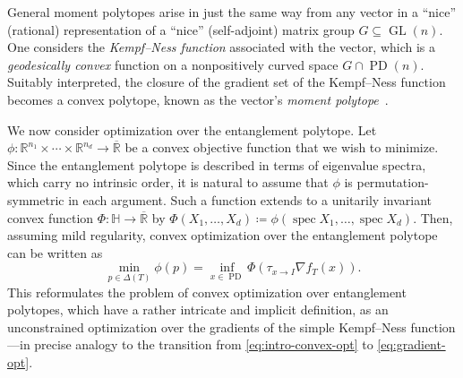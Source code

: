 \documentclass[11pt,letterpaper]{article}
\numberwithin{equation}{section}
\newcommand{\RR}{\mathbb{R}}
\newcommand{\bbH}{\mathbb{H}}
\DeclareMathOperator{\PD}{PD}
\DeclareMathOperator{\spec}{spec}
\DeclareMathOperator{\GL}{GL}
\begin{document}
General moment polytopes arise in just the same way from any vector in a ``nice'' (rational) representation of a ``nice'' (self-adjoint) matrix group $G \subseteq \GL(n)$.
One considers the \emph{Kempf--Ness function} associated with the vector, which is a \emph{geodesically convex} function on a nonpositively curved space $G \cap \PD(n)$.
Suitably interpreted, the closure of the gradient set of the Kempf--Ness function becomes a convex polytope, known as the vector's \emph{moment polytope}~\cite{Kirwan1984,NessMumford1984,BFGOWW2019}.

\medskip

We now consider optimization over the entanglement polytope.
Let $\phi \colon \RR^{n_1}\times\cdots\times\RR^{n_d}\to\overline{\RR}$ be a convex objective function that we wish to minimize.
Since the entanglement polytope is described in terms of eigenvalue spectra, which carry no intrinsic order, it is natural to assume that $\phi$ is permutation-symmetric in each argument.
Such a function extends to a unitarily invariant convex function $\Phi \colon \bbH\to \overline{\RR}$ by $\Phi(X_1,\dots,X_d)\coloneqq \phi(\spec X_1,\dots,\spec X_d)$.
Then, assuming mild regularity, convex optimization over the entanglement polytope can be written as
\begin{equation}\label{eq:intro phi to Phi}
    \min_{p\in\Delta(T)} \phi(p) = \inf_{x\in\PD}\Phi(\tau_{x\to I} \nabla f_T(x)).
\end{equation}
This reformulates the problem of convex optimization over entanglement polytopes, which have a rather intricate and implicit definition, as an unconstrained optimization over the gradients of the simple Kempf--Ness function---in precise analogy to the transition from \cref{eq:intro-convex-opt} to \cref{eq:gradient-opt}.
\end{document}
